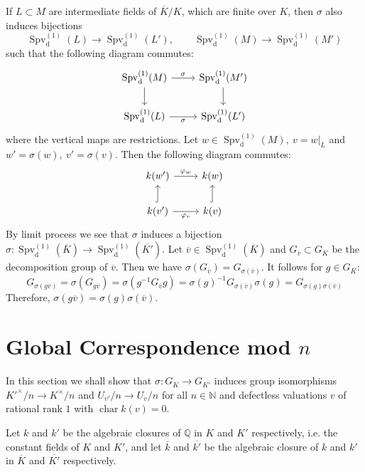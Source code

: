 \begin{remark}\label{3.3}
If $L\subset M$ are intermediate fields of $\overline{K}/K$, which are finite over $K$, then $\sigma$ also induces bijections
\[ \operatorname{Spv}_\text{d}^{(1)}(L) \to \operatorname{Spv}_\text{d}^{(1)}(L'),\qquad \operatorname{Spv}_\text{d}^{(1)}(M) \to \operatorname{Spv}_\text{d}^{(1)}(M') \]
such that the following diagram commutes:
\[\begin{tikzcd}
\operatorname{Spv}_\text{d}^{(1)}(M) \rar["\sigma"]\dar & \operatorname{Spv}_\text{d}^{(1)}(M')\dar\\
\operatorname{Spv}_\text{d}^{(1)}(L) \rar["\sigma"'] & \operatorname{Spv}_\text{d}^{(1)}(L')
\end{tikzcd}\]
where the vertical maps are restrictions. Let $w\in\operatorname{Spv}_\text{d}^{(1)}(M),\ v=w|_L$ and $w'=\sigma(w),\ v'=\sigma(v)$. Then the following diagram commutes:
\[ \begin{tikzcd}
k(w') \rar["\varphi_w"] & k(w)\\
k(v') \rar["\varphi_v"']\uar[hook] & k(v)\uar[hook]
\end{tikzcd} \]
By limit process we see that $\sigma$ induces a bijection $\sigma: \operatorname{Spv}_\text{d}^{(1)}(\overline{K})\to \operatorname{Spv}_\text{d}^{(1)}(\overline{K'})$. Let $\overline{v}\in \operatorname{Spv}_\text{d}^{(1)}(\overline{K})$ and $G_{\overline{v}}\subset G_K$ be the decomposition group of $\overline{v}$. Then we have $\sigma(G_{\overline{v}}) = G_{\sigma(\overline{v})}$. It follows for $g\in G_K$:
\[G_{\sigma(g\overline{v})} = \sigma(G_{g\overline{v}}) = \sigma(g^{-1} G_{\overline{v}}g) = \sigma(g)^{-1} G_{\sigma(\overline{v})}\sigma(g) = G_{\sigma(g)\sigma(\overline{v})}\]
Therefore, $\sigma(g\overline{v})=\sigma(g)\sigma(\overline{v})$.
\end{remark}

\section{Global Correspondence mod \texorpdfstring{$n$}{n}}

In this section we shall show that $\sigma: G_K\to G_{K'}$ induces group isomorphisms $K'^\times/n\to K^\times/n$ and $U_{v'}/n\to U_v/n$ for all $n\in\mathbb{N}$ and defectless valuations $v$ of rational rank $1$ with $\operatorname{char}k(v) =0$.

Let $k$ and $k'$ be the algebraic closures of $\mathbb{Q}$ in $K$ and $K'$ respectively, i.e. the constant fields of $K$ and $K'$, and let $\overline{k}$ and $\overline{k'}$ be the algebraic closure of $k$ and $k'$ in $\overline{K}$ and $\overline{K'}$ respectively.

